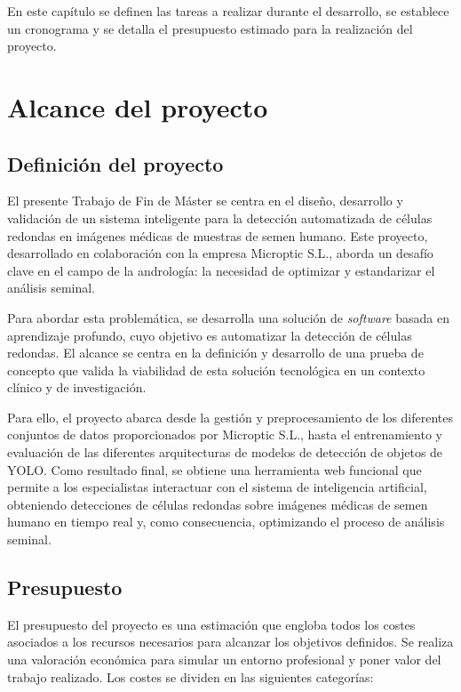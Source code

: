 \documentclass[12pt,a4paper,onecolumn,oneside]{report}
\begin{document}
En este capítulo se definen las tareas a realizar durante el desarrollo,
se establece un cronograma y se detalla el presupuesto estimado para la realización del proyecto.

\section{Alcance del proyecto}
\label{sec:Alcance del proyecto}

\subsection{Definición del proyecto}
\label{sec:Definición del proyecto}

El presente Trabajo de Fin de Máster se centra en el diseño, desarrollo y validación de un sistema inteligente 
para la detección automatizada de células redondas en imágenes médicas de muestras de semen humano. 
Este proyecto, desarrollado en colaboración con la empresa Microptic S.L., 
aborda un desafío clave en el campo de la andrología: la necesidad de optimizar y estandarizar el análisis seminal.

Para abordar esta problemática, se desarrolla una solución de \textit{software} basada en aprendizaje profundo, cuyo objetivo es automatizar 
la detección de células redondas. El alcance se centra en la definición y desarrollo de una prueba de concepto que valida la viabilidad de 
esta solución tecnológica en un contexto clínico y de investigación.

Para ello, el proyecto abarca desde la gestión y preprocesamiento de los diferentes conjuntos de datos proporcionados por Microptic S.L.,
hasta el entrenamiento y evaluación de las diferentes arquitecturas de modelos de detección de objetos de YOLO. 
Como resultado final, se obtiene una herramienta web funcional que permite a los especialistas interactuar con el sistema de inteligencia artificial, 
obteniendo detecciones de células redondas sobre imágenes médicas 
de semen humano en tiempo real y, como consecuencia, optimizando el proceso de análisis seminal.

\subsection{Presupuesto}
\label{sec:Presupuesto}

El presupuesto del proyecto es una estimación que engloba todos los costes asociados a los recursos necesarios para 
alcanzar los objetivos definidos. Se realiza una valoración económica para simular un entorno profesional y poner valor del trabajo realizado.
Los costes se dividen en las siguientes categorías:
\end{document}
